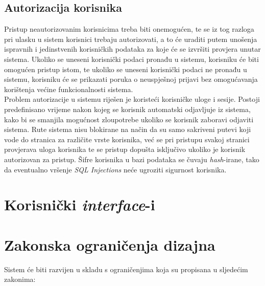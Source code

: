 \documentclass[12pt,a4paper]{article}
\begin{document}
\subsection{Autorizacija korisnika}

\quad Pristup neautorizovanim korisnicima treba biti onemogućen, te se iz tog razloga pri ulasku u sistem korisnici trebaju autorizovati, a to će uraditi putem unošenja ispravnih i jedinstvenih korisničkih podataka za koje će se izvršiti provjera unutar sistema. Ukoliko se uneseni korisnički podaci pronađu u sistemu, korisniku će biti omogućen pristup istom, te ukoliko se uneseni korisnički podaci ne pronađu u sistemu, korisniku će se prikazati poruka o neuspješnoj prijavi bez omogućavanja korištenja većine funkcionalnosti sistema. \\

Problem autorizacije u sistemu riješen je koristeći korisničke uloge i sesije. Postoji predefinisano vrijeme nakon kojeg se korisnik automatski odjavljuje iz sistema, kako bi se smanjila mogućnost zloupotrebe ukoliko se korisnik zaboravi odjaviti sistema. Rute sistema nisu blokirane na način da su samo sakriveni putevi koji vode do stranica za različite vrste korisnika, već se pri pristupu svakoj stranici provjerava uloga korisnika te se pristup dopušta isključivo ukoliko je korisnik autorizovan za pristup. Šifre korisnika u bazi podataka se čuvaju \textit{hash}-irane, tako da eventualno vršenje \textit{SQL Injections} neće ugroziti sigurnost korisnika.

\newpage

\section{Korisnički \textit{interface}-i}

\newpage

\section{Zakonska ograničenja dizajna}

Sistem će biti razvijen u skladu s ograničenjima koja su propisana u sljedećim zakonima:
\end{document}
